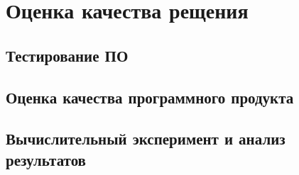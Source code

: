 \newpage
\section{Оценка качества рещения}
\subsection{Тестирование ПО}
\subsection{Оценка качества программного продукта}
\subsection{Вычислительный эксперимент и анализ результатов}
